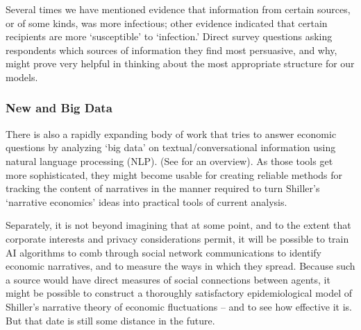 Several times we have mentioned evidence that information from certain sources, or of some kinds, was more infectious;  other evidence indicated that certain recipients are more `susceptible' to `infection.'  %
Direct survey questions asking respondents which sources of information they find most persuasive, and why, might prove very helpful in thinking about the most appropriate structure for our models.%

\subsubsection{New and Big Data}
There is also a rapidly expanding body of work that tries to answer economic questions by analyzing `big data' on textual/conversational information using natural language processing (NLP).  (See \cite{gentzkow2019text} for an overview).  As those tools get more sophisticated, they might become usable for creating reliable methods for tracking the content of narratives in the manner required to turn Shiller's `narrative economics' ideas into practical tools of current analysis.

Separately, it is not beyond imagining that at some point, and to the extent that corporate interests and privacy considerations permit, it will be possible to train AI algorithms to comb through social network communications to identify economic narratives, and to measure the ways in which they spread.  Because such a source would have direct measures of social connections between agents, it might be possible to construct a thoroughly satisfactory epidemiological model of Shiller's narrative theory of economic fluctuations -- and to see how effective it is.  But that date is still some distance in the future.


